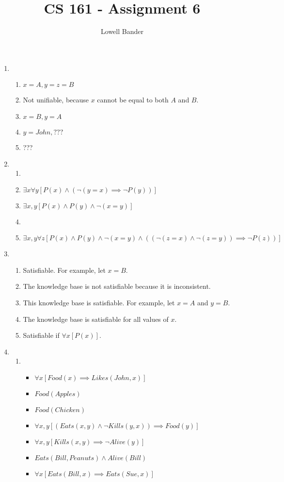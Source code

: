 \documentclass[]{article}
\begin{document}
\title{CS 161 - Assignment 6}
\author{Lowell Bander}
\maketitle

\begin{enumerate}
\item \begin{enumerate}
\item $x = A, y = z = B$
\item Not unifiable, because $x$ cannot be equal to both $A$ and $B$.
\item $x = B, y = A$
\item $y = John, ???$
\item ???
\end{enumerate}

\item \begin{enumerate}
\item 
\item $\exists x \forall y [P(x) \land (\neg(y=x) \implies \neg P(y))]$
\item $\exists x,y [P(x) \land P(y) \land \neg(x = y)]$
\item 
\item $\exists x,y \forall z [P(x) \land P(y) \land \neg(x = y)\land ((\neg(z = x) \land \neg(z = y)) \implies \neg P(z))]$
\end{enumerate}

\item \begin{enumerate}
\item Satisfiable. For example, let $x = B$.
\item The knowledge base is not satisfiable because it is inconsistent.
\item This knowledge base is satisfiable. For example, let $x = A$ and $y = B$.
\item The knowledge base is satisfiable for all values of $x$.
\item Satisfiable if $\forall x [P(x)]$.
\end{enumerate}

\newpage

\item \begin{enumerate}
\item \begin{itemize}
\item $\forall x [Food(x) \implies Likes(John, x)]$
\item $Food(Apples)$
\item $Food(Chicken)$
\item $\forall x,y [(Eats(x,y) \land \neg Kills(y,x)) \implies Food(y)]$
\item $\forall x,y [Kills(x,y) \implies \neg Alive(y)]$
\item $Eats(Bill, Peanuts) \land Alive(Bill)$
\item $\forall x [Eats(Bill, x) \implies Eats(Sue, x)]$
\end{itemize}


\end{enumerate}
\end{enumerate}
\end{document}
